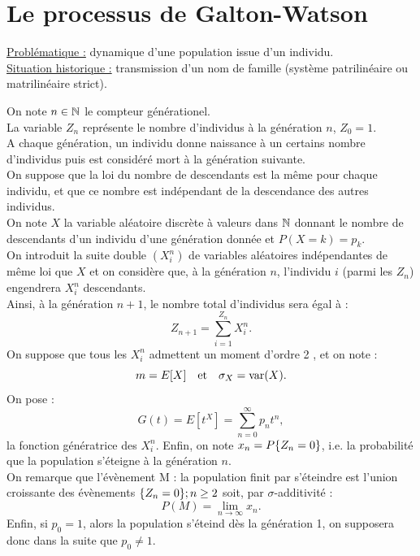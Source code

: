 \newcommand{\om}{\Omega}
\renewcommand{\a}{\mathcal{A}}
\newcommand{\f}{\mathcal{f}}




\pagestyle{fancy}



\section{Le processus de Galton-Watson}

\underline{Problématique :} dynamique d'une population issue d'un individu. \\

\underline{Situation historique :} transmission d'un nom de famille (système patrilinéaire ou matrilinéaire strict). \\

\begin{nota}
On note $n \in \mathbb{N}$ le compteur générationel. \\
La variable $Z_n$ représente le nombre d'individus à la génération $n$, $Z_0 = 1$. \\
A chaque génération, un individu donne naissance à un certains nombre d'individus puis est considéré mort à la génération suivante. \\
On suppose que la loi du nombre de descendants est la même pour chaque individu, et que ce nombre est indépendant de la
descendance des autres individus. \\
On note $X$ la variable aléatoire discrète à valeurs dans $\mathbb{N}$ donnant le nombre de descendants d'un individu d'une génération 
donnée et $P(X=k) = p_k$. \\
On introduit la suite double $(X_i^n)$ de variables aléatoires indépendantes de même loi que $X$ et on considère que, 
à la génération $n$, l'individu $i$ (parmi les $Z_n$) engendrera $X_i^n$ descendants. \\
Ainsi, à la génération $n+1$, le nombre total d'individus sera égal à :
\[ Z_{n+1} = \sum_{i=1}^{Z_n} X_i^n . \] 
On suppose que tous les $X_i^n$ admettent un moment d'ordre 2 , et on note :
\[ m = E[X] \quad \text{et} \quad \sigma_X = \operatorname{var}(X) . \] 
On pose :
\[ G(t) = E[t^X] = \sum_{n=0}^{\infty} p_n t^n , \]
la fonction génératrice des $X_i^n$. Enfin, on note $x_n = P \{ Z_n = 0 \}$, i.e. la probabilité que la population s'éteigne à la génération
$n$. \\
On remarque que l'évènement \og M : la population finit par s'éteindre \fg{} est l'union croissante des évènements 
$\{ Z_n = 0 \} ; n \geq 2$ soit, par $\sigma$-additivité :
\[ P(M) = \lim_{n \to \infty} x_n . \]
Enfin, si $p_0 = 1$, alors la population s'éteind dès la génération 1, on supposera donc dans la suite que $p_0 \neq 1$.
\end{nota}

